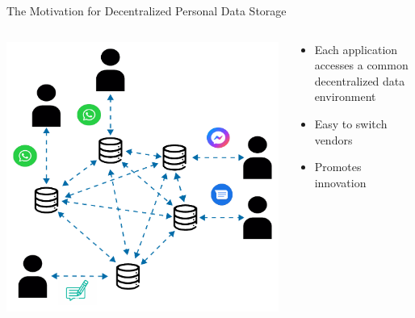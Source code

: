 \begin{frame}{The Motivation for Decentralized Personal Data Storage}
    \begin{columns}[T] %
        \begin{column}{0.6\textwidth} %
            \includegraphics[width=.9\linewidth]{images/decentralized-message-storage.pdf} %
        \end{column}

        \begin{column}{0.4\textwidth} %
            \begin{itemize}
                \item Each application accesses a common decentralized data environment
                \item Easy to switch vendors
                \item Promotes innovation
            \end{itemize}
        \end{column}
    \end{columns}
\end{frame}

